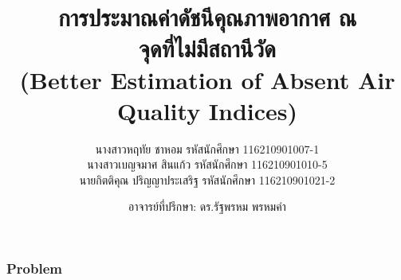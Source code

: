\documentclass[12pt,aspectratio=169]{beamer}
\begin{document}
\title{การประมาณค่าดัชนีคุณภาพอากาศ ณ \\จุดที่ไม่มีสถานีวัด \\ (Better Estimation of Absent Air Quality Indices) } 
\date{อาจารย์ที่ปรึกษา: ดร.รัฐพรหม พรหมคำ}
\author{นางสาวหฤทัย ชาหอม รหัสนักศึกษา 116210901007-1 \\
นางสาวเบญจมาศ สินแก้ว รหัสนักศึกษา 116210901010-5 \\ 
นายกิตติคุณ ปริญญาประเสริฐ รหัสนักศึกษา 116210901021-2}

\maketitle

\begin{frame}
    \frametitle{Problem}
    \end{frame}
\end{document}
